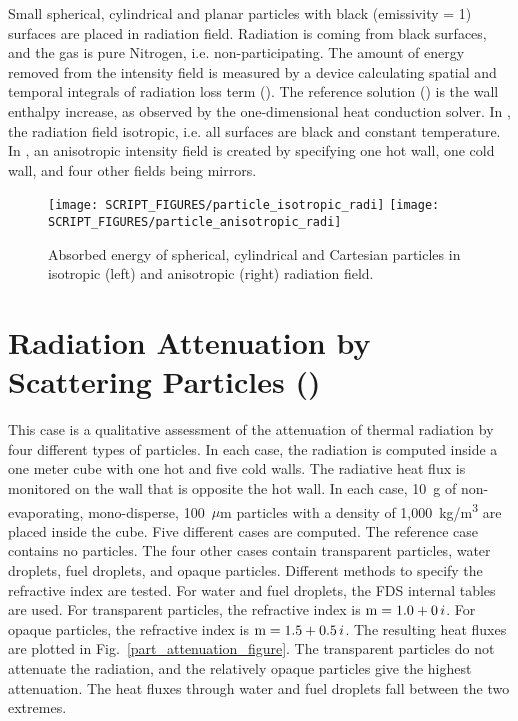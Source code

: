 \documentclass[11pt]{book}
\begin{document}
Small spherical, cylindrical and planar particles with black (emissivity = 1) surfaces are placed in radiation field. Radiation is coming from black surfaces, and the gas is pure Nitrogen, i.e. non-participating. The amount of energy removed from the intensity field is measured by a device calculating spatial and temporal integrals of radiation loss term ().  The reference solution () is the wall enthalpy increase, as observed by the one-dimensional heat conduction solver.
In , the radiation field isotropic, i.e. all surfaces are black and constant temperature. In , an anisotropic intensity field is created by specifying one hot wall, one cold wall, and four other fields being mirrors.

\begin{figure}[ht]
\texttt{[image: SCRIPT\_FIGURES/particle\_isotropic\_radi]}
\texttt{[image: SCRIPT\_FIGURES/particle\_anisotropic\_radi]}
\caption[The  and  test cases]{Absorbed energy of spherical, cylindrical and Cartesian particles in isotropic (left) and anisotropic (right) radiation field.}
\label{particle_an_isotropic_radiation_figs}
\end{figure}


\section{Radiation Attenuation by Scattering Particles (\texorpdfstring{}{part\_attenuation}) }
\label{part_attenuation}

This case is a qualitative assessment of the attenuation of thermal radiation by four different types of particles. In each case, the radiation is computed inside a one meter cube with one hot and five cold walls. The radiative heat flux is monitored on the wall that is opposite the hot wall. In each case, 10~g of non-evaporating, mono-disperse, 100~$\mu$m particles with a density of 1,000~\si{kg/m^3} are placed inside the cube. Five different cases are computed. The reference case contains no particles. The four other cases contain transparent particles, water droplets, fuel droplets, and opaque particles. Different methods to specify the refractive index are tested. For water and fuel droplets, the FDS internal tables are used. For transparent particles, the refractive index is $\hbox{m} = 1.0+0\,i$. For opaque particles, the refractive index is $\hbox{m} = 1.5+0.5 \,i$. The resulting heat fluxes are plotted in Fig.~\ref{part_attenuation_figure}. The transparent particles do not attenuate the radiation, and the relatively opaque particles give the highest attenuation. The heat fluxes through water and fuel droplets fall between the two extremes.
\end{document}
